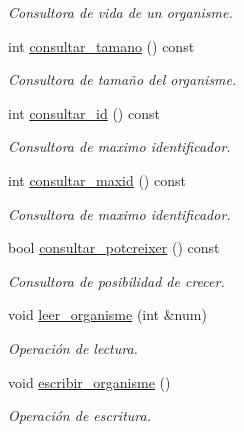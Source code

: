 \begin{DoxyCompactItemize}
\begin{DoxyCompactList}\small\item\em Consultora de vida de un organisme. \end{DoxyCompactList}\item 
int \hyperlink{class_organisme_ac215686620dc98397493f2b6cfe37735}{consultar\-\_\-tamano} () const 
\begin{DoxyCompactList}\small\item\em Consultora de tamaño del organisme. \end{DoxyCompactList}\item 
int \hyperlink{class_organisme_aebe855cdb3f44a278c18d21912f60301}{consultar\-\_\-id} () const 
\begin{DoxyCompactList}\small\item\em Consultora de maximo identificador. \end{DoxyCompactList}\item 
int \hyperlink{class_organisme_a42ffae8888c18bafb3cca2d4140cd2cf}{consultar\-\_\-maxid} () const 
\begin{DoxyCompactList}\small\item\em Consultora de maximo identificador. \end{DoxyCompactList}\item 
bool \hyperlink{class_organisme_a650fae6627523a55b2941c47d0cc3b82}{consultar\-\_\-potcreixer} () const 
\begin{DoxyCompactList}\small\item\em Consultora de posibilidad de crecer. \end{DoxyCompactList}\item 
void \hyperlink{class_organisme_ae53bdafd0b8cf07483aa02ef5e8498cb}{leer\-\_\-organisme} (int \&num)
\begin{DoxyCompactList}\small\item\em Operación de lectura. \end{DoxyCompactList}\item 
void \hyperlink{class_organisme_ac8184de74f9e451daae0c2efed9d1499}{escribir\-\_\-organisme} ()
\begin{DoxyCompactList}\small\item\em Operación de escritura. \end{DoxyCompactList}\end{DoxyCompactItemize}
